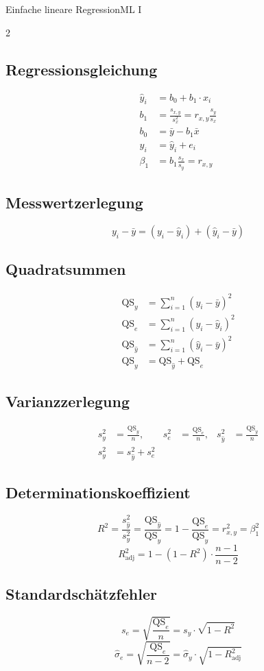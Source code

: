 \begin{formulaBox}{Einfache lineare Regression}{ML I}
\begin{multicols}{2}
\subsection*{Regressionsgleichung}
\begin{align*}
\hat{y}_i &= b_0+b_1\cdot x_{i}\\
b_1 &= \frac{s_{x, y}}{s_x^2}
     = r_{x, y} \frac{s_y}{s_x}\\
b_0 &= \bar{y}-b_1 \bar{x}\\
y_i &= \hat{y}_i + e_i\\
\beta_1 &= b_1\frac{s_x}{s_y}=r_{x, y}
\end{align*}

\subsection*{Messwertzerlegung}
$$y_i-\bar{y}=(y_i-\hat{y}_i)+(\hat{y}_i-\bar{y})$$

\subsection*{Quadratsummen}
\begin{align*}
\mathrm{QS}_y &= \sum\limits_{i=1}^{n}(y_i-\bar{y})^2\\
\mathrm{QS}_e &= \sum\limits_{i=1}^{n}(y_i-\hat{y}_i)^2\\
\mathrm{QS}_{\hat{y}} &= \sum\limits_{i=1}^{n}(\hat{y}_i-\bar{y})^2\\
\mathrm{QS}_y &= \mathrm{QS}_{\hat{y}}+\mathrm{QS}_e
\end{align*}

\subsection*{Varianzzerlegung}
\begin{align*}
s_y^2 &= \frac{\mathrm{QS}_y}{n}, &
s_e^2 &= \frac{\mathrm{QS}_e}{n}, &
s_{\hat{y}}^2 &= \frac{\mathrm{QS}_{\hat{y}}}{n}\\
s_y^2 &= s_{\hat{y}}^2+s_e^2
\end{align*}

\subsection*{Determinationskoeffizient} 
$$R^2=\frac{s_{\hat{y}}^2}{s_y^2}=\frac{\mathrm{QS}_{\hat{y}}}{\mathrm{QS}_y}=1-\frac{\mathrm{QS}_e}{\mathrm{QS}_y}=r_{x, y}^2=\beta_1^2$$
$$R^2_{\mathrm{adj}}=1-(1-R^2)\cdot\frac{n-1}{n-2} $$

\subsection*{Standardschätzfehler}
$$s_e= \sqrt{\frac{\mathrm{QS}_e}{n}} = s_y\cdot\sqrt{1-R^2}$$
$$\hat{\sigma}_e = \sqrt{\frac{\mathrm{QS}_e}{n-2}}
= \hat{\sigma}_y\cdot\sqrt{1-R^2_{\mathrm{adj}}}$$

\end{multicols}
\end{formulaBox}

